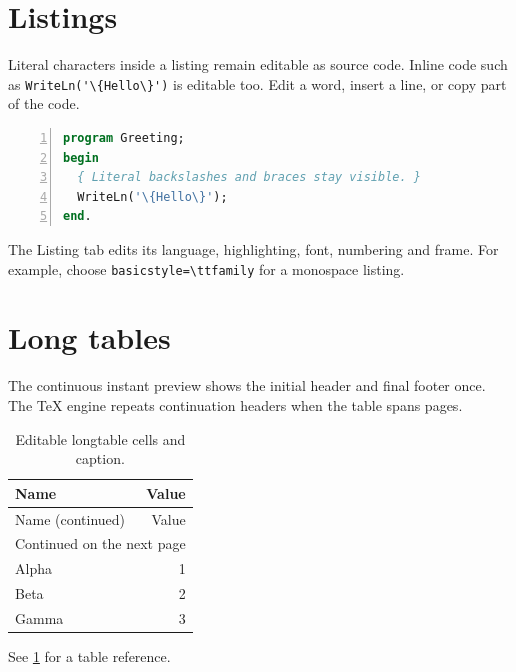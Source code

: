 \documentclass[12pt]{article}
\begin{document}
\section{Listings}
Literal characters inside a listing remain editable as source code. Inline code such as \lstinline|WriteLn('\{Hello\}')|
is editable too. Edit a word, insert a line, or copy part of the code.
\begin{lstlisting}[language=Pascal,numbers=left]
program Greeting;
begin
  { Literal backslashes and braces stay visible. }
  WriteLn('\{Hello\}');
end.
\end{lstlisting}
The Listing tab edits its language, highlighting, font, numbering and frame.
For example, choose \verb|basicstyle=\ttfamily| for a monospace listing.

\section{Long tables}
The continuous instant preview shows the initial header and final footer
once. The TeX engine repeats continuation headers when the table spans pages.
\begin{longtable}{|l|r|}
\caption{Editable longtable cells and caption.}\label{tab:packages}\\
\hline Name&Value\\\hline
\endfirsthead
\hline Name (continued)&Value\\\hline
\endhead
\hline\multicolumn{2}{r}{Continued on the next page}\\
\endfoot
\hline
\endlastfoot
Alpha&1\\
Beta&2\\
Gamma&3\\
\hline
\end{longtable}
See \cref{tab:packages} for a table reference.
\end{document}
